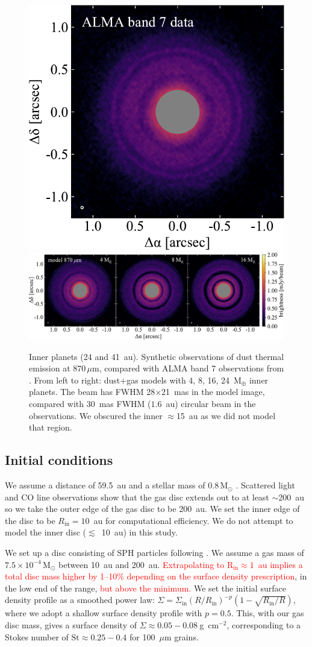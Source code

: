 \documentclass[usenatbib,a4paper,times]{mnras}
\newcommand{\st}{\mathrm{St}}
\renewcommand{\sun}{\mathrm{M}_{\odot}}
\renewcommand{\earth}{\mathrm{M}_{\oplus}}
\newcommand{\new}[1]{{\textcolor{red}{#1}}}
\begin{document}
\begin{figure}
   \begin{center}
      \includegraphics[height=0.200\textwidth]{figs/andrews-2016.pdf} \quad
      \includegraphics[height=0.200\textwidth]{figs/alma-image.pdf}
      \caption{Inner planets (24 and 41~au). Synthetic observations of dust
         thermal emission at $870\,\mu$m, compared with ALMA band 7 observations
         from \citet{andrews:2016}. From left to right: dust+gas models with 4,
         8, 16, 24~$\earth$ inner planets. The beam has FWHM 28$\times$21~mas in
         the model image, compared with 30~mas FWHM ($1.6$~au) circular beam in
         the observations. We obscured the inner $\approx$15~au as we did not
         model that region.\label{fig:alma}}
   \end{center}
\end{figure}





\subsection{Initial conditions}

We assume a distance of 59.5~au \citep{gaia-collaboration:2016} and a stellar
mass of $0.8\,\sun{}$ \citep{andrews:2012}. Scattered light and CO line
observations show that the gas disc extends out to at least $\sim$200~au
\citep{thi:2010} so we take the outer edge of the gas disc to be 200~au. We set
the inner edge of the disc to be $R_{\mathrm{in}}=10$~au for computational
efficiency. We do not attempt to model the inner disc ($\lesssim$~10~au) in this
study.

We set up a disc consisting of SPH particles following \citet{lodato:2010}. We
assume a gas mass of $7.5\times 10^{-4}\,\sun{}$ between 10~au and 200~au.
\new{Extrapolating to $\mathrm{R_{in}}\approx 1$~au implies a total disc mass
higher by 1--10\% depending on the surface density prescription}, in the low end
of the \citet{thi:2010} range, \new{but above the \citet{teague:2018a} minimum.}
We set the initial surface density profile as a smoothed power law: $\Sigma =
\Sigma_{\mathrm{in}} {(R/R_{\mathrm{in}})}^{-p} (1-\sqrt{R_{\mathrm{in}}/R})$,
where we adopt a shallow surface density profile with $p=0.5$. This, with our
gas disc mass, gives a surface density of $\Sigma \approx 0.05-0.08\
$g~cm${}^{-2}$, corresponding to a Stokes number of $\st{}\approx 0.25-0.4$ for
100~$\mu$m grains.
\end{document}

